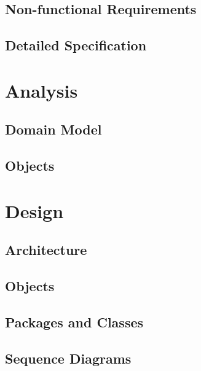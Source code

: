 \documentclass[a4paper,parskip=full]{scrreprt}
\begin{document}
\section{Non-functional Requirements}

\section{Detailed Specification}


\chapter{Analysis}

\section{Domain Model}

\section{Objects}


\chapter{Design}

\section{Architecture}

\section{Objects}

\section{Packages and Classes}

\section{Sequence Diagrams}
\end{document}
